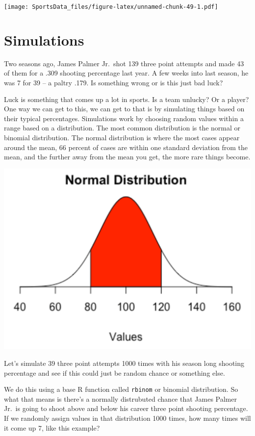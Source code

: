 \documentclass[]{book}
\begin{document}
\texttt{[image: SportsData\_files/figure-latex/unnamed-chunk-49-1.pdf]}

\hypertarget{simulations}{%
\chapter{Simulations}\label{simulations}}

Two seasons ago, James Palmer Jr.~shot 139 three point attempts and made 43 of them for a .309 shooting percentage last year. A few weeks into last season, he was 7 for 39 -- a paltry .179. Is something wrong or is this just bad luck?

Luck is something that comes up a lot in sports. Is a team unlucky? Or a player? One way we can get to this, we can get to that is by simulating things based on their typical percentages. Simulations work by choosing random values within a range based on a distribution. The most common distribution is the normal or binomial distribution. The normal distribution is where the most cases appear around the mean, 66 percent of cases are within one standard deviation from the mean, and the further away from the mean you get, the more rare things become.

\includegraphics[width=17.64in]{images/simulations2}

Let's simulate 39 three point attempts 1000 times with his season long shooting percentage and see if this could just be random chance or something else.

We do this using a base R function called \texttt{rbinom} or binomial distribution. So what that means is there's a normally distrubuted chance that James Palmer Jr.~is going to shoot above and below his career three point shooting percentage. If we randomly assign values in that distribution 1000 times, how many times will it come up 7, like this example?
\end{document}

